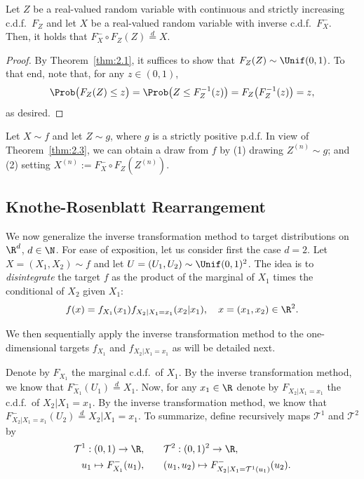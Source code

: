 \begin{theorem}
\label{thm:2.3}
Let $Z$ be a real-valued random variable with continuous and strictly increasing c.d.f.\ $F_Z$ and let $X$ be a real-valued random variable with inverse c.d.f.\ $F_X^-$. Then, it holds that $F_X^- \circ F_Z(Z) \overset{d}{=} X$.
\end{theorem}

\begin{proof}
By Theorem~\ref{thm:2.1}, it suffices to show that $F_Z(Z) \sim \Unif(0,1)$. To that end, note that, for
any $z \in (0,1)$,
\[
  \Prob\bigl(F_Z(Z) \le z\bigr) = \Prob\bigl(Z \le F_Z^{-1}(z)\bigr) = F_Z\bigl(F_Z^{-1}(z)\bigr) = z,
\]
as desired.
\end{proof}

Let $X \sim f$ and let $Z \sim g$, where $g$ is a strictly positive p.d.f. In view of Theorem~\ref{thm:2.3}, we
can obtain a draw from $f$ by (1) drawing $Z^{(n)} \sim g$; and (2) setting $X^{(n)} := F_X^- \circ F_Z(Z^{(n)})$.

\subsection{Knothe-Rosenblatt Rearrangement}
\label{sec:2.1.2}

We now generalize the inverse transformation method to target distributions on $\R^d$, $d \in \N$.
For ease of exposition, let us consider first the case $d = 2$. Let $X = (X_1, X_2) \sim f$ and let
$U = (U_1, U_2) \sim \Unif(0,1)^2$. The idea is to \textit{disintegrate} the target $f$ as the product of the
marginal of $X_1$ times the conditional of $X_2$ given $X_1$:
\[
  f(x) = f_{X_1}(x_1) f_{X_2|X_1=x_1}(x_2|x_1), \quad x = (x_1, x_2) \in \R^2.
\]

We then sequentially apply the inverse transformation method to the one-dimensional targets
$f_{X_1}$ and $f_{X_2|X_1=x_1}$ as will be detailed next.

Denote by $F_{X_1}$ the marginal c.d.f.\ of $X_1$. By the inverse transformation method, we know
that $F_{X_1}^-(U_1) \overset{d}{=} X_1$. Now, for any $x_1 \in \R$ denote by $F_{X_2|X_1=x_1}$ the c.d.f.\ of $X_2 | X_1 =
x_1$. By the inverse transformation method, we know that $F_{X_2|X_1=x_1}^-(U_2) \overset{d}{=} X_2|X_1 = x_1$. To
summarize, define recursively maps $\mathcal{T}^1$ and $\mathcal{T}^2$ by
\begin{align*}
  \mathcal{T}^1 : (0,1) \to \R, & \qquad \mathcal{T}^2 : (0,1)^2 \to \R, \\
  u_1 \mapsto F_{X_1}^-(u_1), & \qquad (u_1, u_2) \mapsto F_{X_2|X_1=\mathcal{T}^1(u_1)}^-(u_2).
\end{align*}

